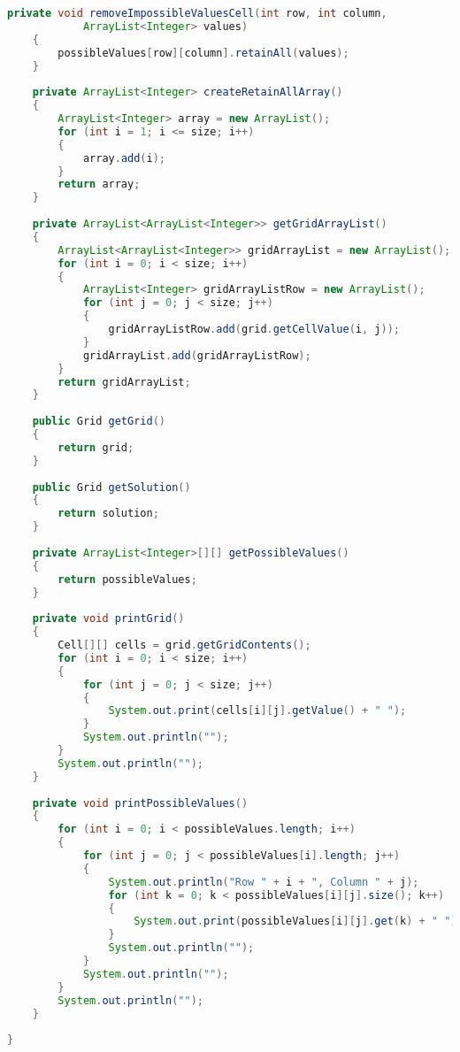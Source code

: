 \begin{lstlisting}[language=Java,basicstyle=\tiny,caption=SolverRuleBased.java]
    private void removeImpossibleValuesCell(int row, int column, 
            ArrayList<Integer> values)
    {
        possibleValues[row][column].retainAll(values);
    }
    
    private ArrayList<Integer> createRetainAllArray()
    {
        ArrayList<Integer> array = new ArrayList();
        for (int i = 1; i <= size; i++)
        {
            array.add(i);
        }
        return array;
    }
    
    private ArrayList<ArrayList<Integer>> getGridArrayList()
    {
        ArrayList<ArrayList<Integer>> gridArrayList = new ArrayList();
        for (int i = 0; i < size; i++)
        {
            ArrayList<Integer> gridArrayListRow = new ArrayList();
            for (int j = 0; j < size; j++)
            {
                gridArrayListRow.add(grid.getCellValue(i, j));
            }
            gridArrayList.add(gridArrayListRow);
        }
        return gridArrayList;
    }
    
    public Grid getGrid()
    {
        return grid;
    }
    
    public Grid getSolution()
    {
        return solution;
    }
    
    private ArrayList<Integer>[][] getPossibleValues()
    {
        return possibleValues;
    }
    
    private void printGrid()
    {
        Cell[][] cells = grid.getGridContents();
        for (int i = 0; i < size; i++)
        {
            for (int j = 0; j < size; j++)
            {
                System.out.print(cells[i][j].getValue() + " ");
            }
            System.out.println("");
        }
        System.out.println("");
    }
    
    private void printPossibleValues()
    {
        for (int i = 0; i < possibleValues.length; i++)
        {
            for (int j = 0; j < possibleValues[i].length; j++)
            {
                System.out.println("Row " + i + ", Column " + j);
                for (int k = 0; k < possibleValues[i][j].size(); k++)
                {
                    System.out.print(possibleValues[i][j].get(k) + " ");
                }
                System.out.println("");
            }
            System.out.println("");
        }
        System.out.println("");
    }
    
}
\end{lstlisting}

